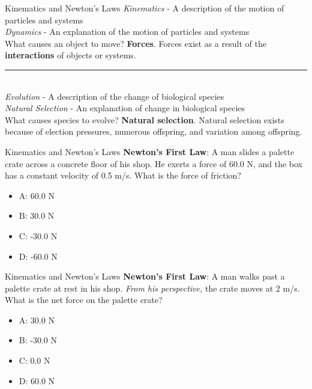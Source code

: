 \documentclass{beamer}
\begin{document}
\begin{frame}{Kinematics and Newton's Laws}
\small
\textit{Kinematics} - A \alert{description} of the motion of particles and systems \\
\textit{Dynamics} - An \alert{explanation} of the motion of particles and systems \\
\vspace{0.25cm}
What causes an object to move?  \textbf{Forces}.  Forces exist as a result of the \alert{\textbf{interactions}} of objects or systems.\\
\vspace{0.25cm}
\rule{10cm}{0.4pt} \\
\vspace{0.25cm}
\textit{Evolution} - A \alert{description} of the change of biological species \\
\textit{Natural Selection} - An \alert{explanation} of change in biological species \\
\vspace{0.25cm}
What causes species to evolve?  \textbf{Natural selection}.  Natural selection exists because of \alert{election pressures}, \alert{numerous offspring}, and \alert{variation} among offspring.
\end{frame}

\begin{frame}{Kinematics and Newton's Laws}
\textbf{Newton's First Law}: A man slides a palette crate across a concrete floor of his shop.  He exerts a force of 60.0 N, and the box has a constant velocity of 0.5 m/s.  What is the force of friction?
\begin{itemize}
\item A: 60.0 N
\item B: 30.0 N
\item C: -30.0 N
\item D: -60.0 N
\end{itemize}
\end{frame}

\begin{frame}{Kinematics and Newton's Laws}
\textbf{Newton's First Law}: A man walks past a palette crate at rest in his shop.  \textit{From his perspective,} the crate moves at 2 m/s.  What is the net force on the palette crate?
\begin{itemize}
\item A: 30.0 N
\item B: -30.0 N
\item C: 0.0 N
\item D: 60.0 N
\end{itemize}
\end{frame}
\end{document}
